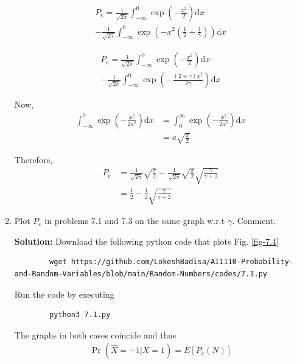 \documentclass[journal,12pt,twocolumn]{IEEEtran}
\newcommand{\solution}{\noindent \textbf{Solution: }}
\providecommand{\pr}[1]{\ensuremath{\Pr\left(#1\right)}}
\providecommand{\brak}[1]{\ensuremath{\left(#1\right)}}
\providecommand{\mean}[1]{E\left[ #1 \right]}
\providecommand{\der}[1]{\mathrm{d} #1}
\numberwithin{equation}{section}
\renewcommand\thesection{\arabic{section}}
\begin{document}
\begin{enumerate}[label=\thesection.\arabic*,ref=\thesection.\theenumi]
	\begin{multline}
		P_e = \frac{1}{\sqrt{2\pi}} \int_{-\infty}^{0} \exp\brak{-\frac{x^2}{2}} \der{x} \\
		- \frac{1}{\sqrt{2\pi}} \int_{-\infty}^{0}  \exp\brak{-x^2\brak{\frac{1}{2} + \frac{1}{\gamma}}} \der{x}
	\end{multline}
	
	\begin{multline}
		P_e = \frac{1}{\sqrt{2\pi}} \int_{-\infty}^{0} \exp\brak{-\frac{x^2}{2}} \der{x} \\
		- \frac{1}{\sqrt{2\pi}} \int_{-\infty}^{0}  \exp\brak{-\frac{(2+\gamma) x^2}{2\gamma} } \der{x}
	\end{multline}
	
	Now,
	\begin{align}
		\int_{-\infty}^{0} \exp\brak{-\frac{x^2}{2a^2}} \der{x} &= \int_{0}^{\infty} \exp\brak{-\frac{x^2}{2a^2}} \der{x} \\
		 &= a \sqrt{\frac{\pi}{2}}
	\end{align}
	
	Therefore,
	\begin{align}
		P_e &= \frac{1}{\sqrt{2\pi}} \sqrt{\frac{\pi}{2}} - \frac{1}{\sqrt{2\pi}} \sqrt{\frac{\pi}{2}} \sqrt{\frac{\gamma}{\gamma+2}} \\
		&= \frac{1}{2} - \frac{1}{2} \sqrt{\frac{\gamma}{\gamma+2}}
	\end{align}
	
	\item Plot $P_e$ in problems 7.1 and 7.3 on the same graph w.r.t $\gamma$.  Comment.
	
	\solution Download the following python code that plots Fig. \ref{fig-7.4} 
	\begin{lstlisting}
		wget https://github.com/LokeshBadisa/AI1110-Probability-and-Random-Variables/blob/main/Random-Numbers/codes/7.1.py
	\end{lstlisting}
	Run the code by executing
	\begin{lstlisting}
		python3 7.1.py
	\end{lstlisting}
	
	The graphs in both cases coincide and thus
	\begin{align}
		\pr{\hat{X} = -1|X = 1} = \mean{P_e(N)}
	\end{align}
	

\end{enumerate}
\end{document}

